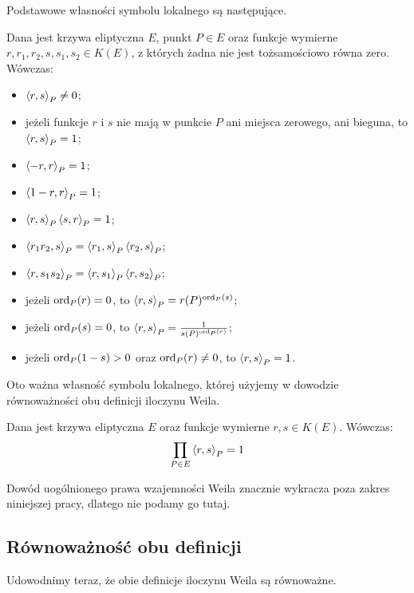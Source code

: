 Podstawowe własności symbolu lokalnego są następujące.

\begin{theorem}
Dana jest krzywa eliptyczna $E$, punkt $P \in E$
oraz funkcje wymierne $r, r_1, r_2, s, s_1, s_2 \in K(E)$,
z których żadna nie jest tożsamościowo równa zero.
Wówczas:
\begin{itemize}
\item
$\left\langle r , s \right\rangle_{P} \neq 0$;
\item
jeżeli funkcje $r$ i $s$ nie mają w punkcie $P$
ani miejsca zerowego, ani bieguna,
to $\left\langle r , s \right\rangle_{P} = 1$;
\item
$\left\langle -r , r \right\rangle_{P} = 1$;
\item
$\left\langle 1-r , r \right\rangle_{P} = 1$;
\item
$\left\langle r , s \right\rangle_{P}\left\langle s , r \right\rangle_{P} = 1$;
\item
$\left\langle r_1r_2 , s \right\rangle_{P} = \left\langle r_1 , s \right\rangle_{P}\left\langle r_2 , s \right\rangle_{P}$;
\item
$\left\langle r , s_1s_2 \right\rangle_{P} = \left\langle r , s_1 \right\rangle_{P}\left\langle r , s_2 \right\rangle_{P}$;
\item
jeżeli $\operatorname{ord}_P(r) = 0$, to $\left\langle r , s \right\rangle_{P} = r(P)^{\operatorname{ord}_P(s)}$;
\item
jeżeli $\operatorname{ord}_P(s) = 0$, to $\left\langle r , s \right\rangle_{P} = \frac{1}{s(P)^{\operatorname{ord}_P(r)}}$;
\item
jeżeli $\operatorname{ord}_P(1-s) > 0$ oraz $\operatorname{ord}_P(r) \neq 0$, to $\left\langle r , s \right\rangle_{P} = 1$.
\end{itemize}
\end{theorem}

Oto ważna własność symbolu lokalnego,
której użyjemy w dowodzie równoważności obu definicji iloczynu Weila.

\begin{theorem}
Dana jest krzywa eliptyczna $E$ oraz funkcje wymierne $r, s \in K(E)$.
Wówczas:
\begin{equation}
\prod_{P \in E} \left\langle r , s \right\rangle_{P} = 1
\end{equation}
\end{theorem}

Dowód uogólnionego prawa wzajemności Weila znacznie wykracza
poza zakres niniejszej pracy, dlatego nie podamy go tutaj.

\subsection*{Równoważność obu definicji}

Udowodnimy teraz, że obie definicje iloczynu Weila są równoważne.

